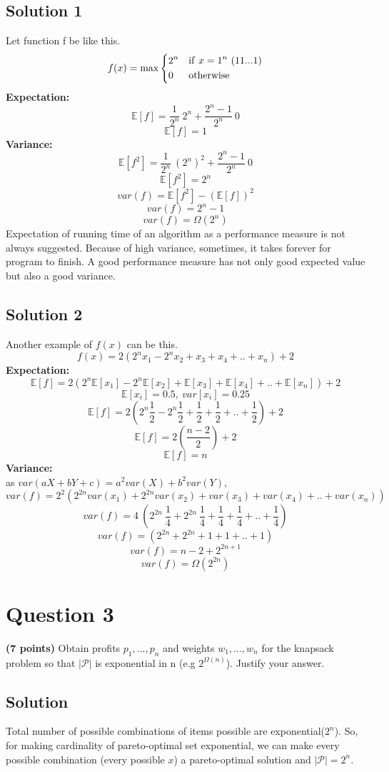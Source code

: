 \documentclass{article}
\begin{document}
\subsection*{Solution 1}
Let function f be like this.  
\[
    f(x) = \max\begin{dcases}
    2^n   &  \mathrm{if}\ x= 1^n \ (11...1)                   \\
    0   &  \mathrm{otherwise}        \\
      \end{dcases}
    \]
\textbf{Expectation:}
$$\mathbb{E}[f] = \frac{1}{2^n}\ 2^n + \frac{2^n-1}{2^n}\ 0$$
$$\mathbb{E}[f] = 1$$
\textbf{Variance:}
$$\mathbb{E}[f^2] = \frac{1}{2^n}\ (2^n)^2 + \frac{2^n-1}{2^n}\ 0$$
$$\mathbb{E}[f^2] = 2^n$$
$$var(f) = \mathbb{E}[f^2] - (\mathbb{E}[f])^2$$
$$var(f) = 2^n - 1$$
$$var(f) = \Omega(2^n)$$
Expectation of running time of an algorithm as a performance measure is not always suggested. Because of high variance, sometimes, it takes forever for program to finish. A good performance measure has not only good expected value but also a good variance.
\subsection*{Solution 2}
Another example of $f(x)$ can be this.
$$f(x) = 2(2^nx_1-2^nx_2+x_3+x_4+..+x_n)+2$$
\textbf{Expectation:}
$$\mathbb{E}[f] = 2(2^n\mathbb{E}[x_1]-2^n\mathbb{E}[x_2]+\mathbb{E}[x_3]+\mathbb{E}[x_4]+..+\mathbb{E}[x_n])+2$$
$$\mathbb{E}[x_i] = 0.5, \ var[x_i] = 0.25$$
$$\mathbb{E}[f] = 2(2^n\frac{1}{2}-2^n\frac{1}{2}+\frac{1}{2}+\frac{1}{2}+..+\frac{1}{2})+2$$
$$\mathbb{E}[f] = 2(\frac{n-2}{2})+2$$
$$\mathbb{E}[f] = n$$
\textbf{Variance:}\\
as $var(aX+bY+c) = a^2var(X)+ b^2var(Y)$,
$$var(f) = 2^2(2^{2n}var(x_1)+2^{2n}var(x_2)+var(x_3)+var(x_4)+..+var(x_n))$$
$$var(f) = 4 \ (2^{2n} \ \frac{1}{4}+2^{2n} \ \frac{1}{4}+\frac{1}{4}+\frac{1}{4}+..+\frac{1}{4})$$
$$var(f) = (2^{2n}+2^{2n}+1+1+..+1)$$
$$var(f) = n-2+2^{2n+1}$$
$$var(f) = \Omega(2^{2n})$$

\newpage
\section*{Question 3}
\textbf{(7 points)} Obtain profits $p_1,...,p_n$ and weights $w_1,...,w_n$ for the knapsack problem so that $|\mathcal{P}|$ is exponential in n (e.g $2^{\Omega(n)}$). Justify your answer.
\subsection*{Solution}
\hspace{5mm}Total number of possible combinations of items possible are exponential($2^n$). So, for making cardinality of pareto-optimal set exponential, we can make every possible combination (every possible $x$) a pareto-optimal solution and $|\mathcal{P}| = 2^n$.
\end{document}
